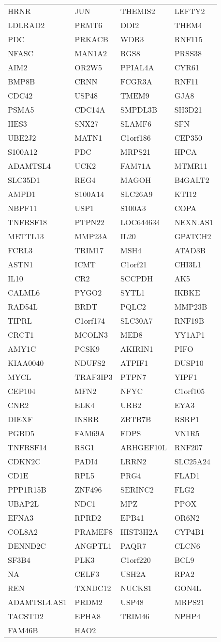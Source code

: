 {\begin{longtable}{llll}
HRNR&JUN&THEMIS2&LEFTY2\tabularnewline
LDLRAD2&PRMT6&DDI2&THEM4\tabularnewline
PDC&PRKACB&WDR3&RNF115\tabularnewline
NFASC&MAN1A2&RGS8&PRSS38\tabularnewline
AIM2&OR2W5&PPIAL4A&CYR61\tabularnewline
BMP8B&CRNN&FCGR3A&RNF11\tabularnewline
CDC42&USP48&TMEM9&GJA8\tabularnewline
PSMA5&CDC14A&SMPDL3B&SH3D21\tabularnewline
HES3&SNX27&SLAMF6&SFN\tabularnewline
UBE2J2&MATN1&C1orf186&CEP350\tabularnewline
S100A12&PDC&MRPS21&HPCA\tabularnewline
ADAMTSL4&UCK2&FAM71A&MTMR11\tabularnewline
SLC35D1&REG4&MAGOH&B4GALT2\tabularnewline
AMPD1&S100A14&SLC26A9&KTI12\tabularnewline
NBPF11&USP1&S100A3&COPA\tabularnewline
TNFRSF18&PTPN22&LOC644634&NEXN.AS1\tabularnewline
METTL13&MMP23A&IL20&GPATCH2\tabularnewline
FCRL3&TRIM17&MSH4&ATAD3B\tabularnewline
ASTN1&ICMT&C1orf21&CHI3L1\tabularnewline
IL10&CR2&SCCPDH&AK5\tabularnewline
CALML6&PYGO2&SYTL1&IKBKE\tabularnewline
RAD54L&BRDT&PQLC2&MMP23B\tabularnewline
TIPRL&C1orf174&SLC30A7&RNF19B\tabularnewline
CRCT1&MCOLN3&MED8&YY1AP1\tabularnewline
AMY1C&PCSK9&AKIRIN1&PIFO\tabularnewline
KIAA0040&NDUFS2&ATPIF1&DUSP10\tabularnewline
MYCL&TRAF3IP3&PTPN7&YIPF1\tabularnewline
CEP104&MFN2&NFYC&C1orf105\tabularnewline
CNR2&ELK4&URB2&EYA3\tabularnewline
DIEXF&INSRR&ZBTB7B&RSRP1\tabularnewline
PGBD5&FAM69A&FDPS&VN1R5\tabularnewline
TNFRSF14&RSG1&ARHGEF10L&RNF207\tabularnewline
CDKN2C&PADI4&LRRN2&SLC25A24\tabularnewline
CD1E&RPL5&PRG4&FLAD1\tabularnewline
\newpage
PPP1R15B&ZNF496&SERINC2&FLG2\tabularnewline
UBAP2L&NDC1&MPZ&PPOX\tabularnewline
EFNA3&RPRD2&EPB41&OR6N2\tabularnewline
COL8A2&PRAMEF8&HIST3H2A&CYP4B1\tabularnewline
DENND2C&ANGPTL1&PAQR7&CLCN6\tabularnewline
SF3B4&PLK3&C1orf220&BCL9\tabularnewline
NA&CELF3&USH2A&RPA2\tabularnewline
REN&TXNDC12&NUCKS1&GON4L\tabularnewline
ADAMTSL4.AS1&PRDM2&USP48&MRPS21\tabularnewline
TACSTD2&EPHA8&TRIM46&NPHP4\tabularnewline
FAM46B&HAO2&&\tabularnewline
\bottomrule
\end{longtable}}
\addtocounter{table}{-1}
